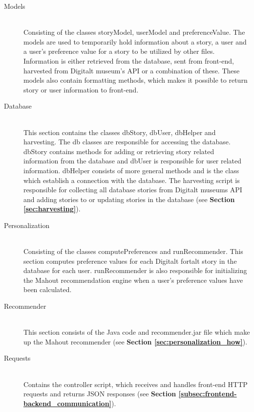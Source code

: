 \begin{description}
	\item[Models] \hfill \\
	Consisting of the classes storyModel, userModel and preferenceValue. The models are used to temporarily hold information about a story, a user and a user's preference value for a story to be utilized by other files. Information is either retrieved from the database, sent from front-end, harvested from Digitalt museum's API or a combination of these. These models also contain formatting methods, which makes it possible to return story or user information to front-end.
	
	\item[Database] \hfill \\
	This section contains the classes dbStory, dbUser, dbHelper and harvesting. The db classes are responsible for accessing the database. dbStory contains methods for adding or retrieving story related information from the database and dbUser is responsible for user related information. dbHelper consists of more general methods and is the class which establish a connection with the database. The harvesting script is responsible for collecting all database stories from Digitalt museums API and adding stories to or updating stories in the database (see \textbf{Section \ref{sec:harvesting}}).
	
	\item[Personalization] \hfill \\
	Consisting of the classes computePreferences and runRecommender. This section computes preference values for each Digitalt fortalt story in the database for each user. runRecommender is also responsible for initializing the Mahout recommendation engine when a user's preference values have been calculated.
	
	\item[Recommender] \hfill \\
	This section consists of the Java code and recommender.jar file which make up the Mahout recommender (see \textbf{Section \ref{sec:personalization_how}}).
	
	\item[Requests] \hfill \\
	Contains the controller script, which receives and handles front-end HTTP requests and returns JSON responses (see \textbf{Section \ref{subsec:frontend-backend_communication}}).
	
\end{description}

